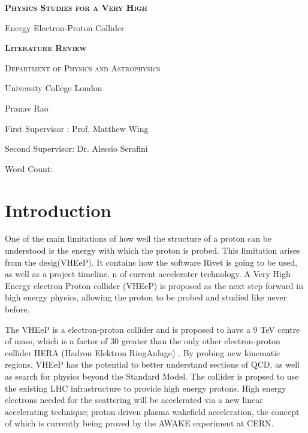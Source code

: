 \documentclass[journal, a4paper,10pt]{IEEEtran}
\begin{document}
\begin{titlepage}
	\centering
    \vspace{2cm}
    {\scshape\LARGE\bfseries Physics Studies for a Very High \par Energy Electron-Proton Collider\par}
    \vspace{2cm}
	{\scshape\Large\bfseries Literature Review\par}
	\vspace{2cm}
	{\scshape\Large Department of Physics and Astrophysics\par University College London\par}
	\vspace{4cm}
	{\huge\bfseries\par}
	{\large Pranav Rao\par}
	{\large First Supervisor : Prof. Matthew Wing\par Second Supervisor: Dr. Alessio Serafini\par}
	\vspace{8cm}
	Word Count: 

	\vfill
\end{titlepage}

\justify

\begin{abstract}

This literature study aims to provide context and motivation for the project that is being undertaken. It explores the subjects of deep inelastic scattering, plasma wakefield acceleration and a very high energy electron proton collider 
\end{abstract}

\section{Introduction}

One of the main limitations of how well the structure of a proton can be understood is the energy with which the proton is probed. This limitation arises from the desig(VHEeP). It contains how the software Rivet is going to be used, as well as a project timeline. 
n of current accelerater technology. A Very High Energy electron Proton collider (VHEeP) is proposed as the next step forward in high energy physics, allowing the proton to be probed and studied like never before.

The VHEeP is a electron-proton collider and is proposed \cite{VHEeP} to have a 9 TeV centre of mass, which is a factor of 30 greater than the only other electron-proton collider HERA (Hadron Elektron RingAnlage) \cite{HERA}. By probing new kinematic regions, VHEeP has the potential to better understand sections of QCD, as well as search for physics beyond the Standard Model. The collider is propsed to use the existing LHC infrastructure to provide high energy protons. High energy electrons needed for the scattering will be accelerated via a new linear accelerating technique; proton driven plasma wakefield acceleration, the concept of which is currently being proved by the AWAKE \cite{AWAKE1,AWAKE2} experiment at CERN.
\end{document}
